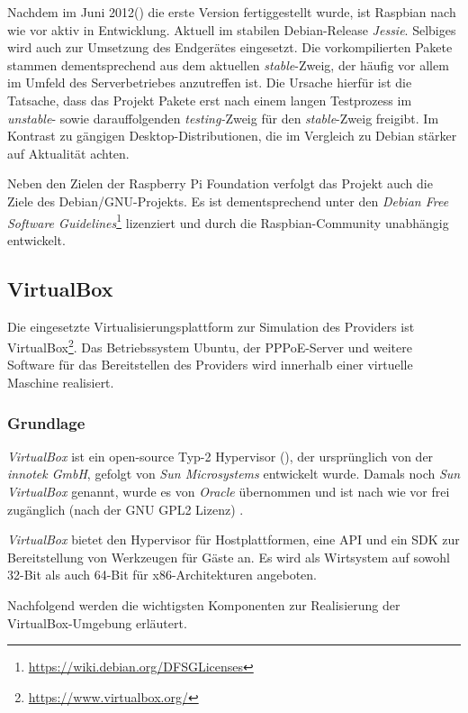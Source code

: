 Nachdem im Juni 2012(\cite{raspbianweb}) die erste
Version fertiggestellt wurde, ist Raspbian nach wie vor aktiv
in Entwicklung. Aktuell im stabilen Debian-Release \textit{Jessie}.
Selbiges wird auch zur Umsetzung des Endgerätes eingesetzt.
Die vorkompilierten Pakete stammen dementsprechend aus dem aktuellen
\textit{stable}-Zweig, der häufig vor allem im Umfeld des Serverbetriebes
anzutreffen ist. Die Ursache hierfür ist die Tatsache, dass das
Projekt Pakete erst nach einem langen Testprozess im \textit{unstable}-
sowie darauffolgenden \textit{testing-}Zweig für den \textit{stable}-Zweig
freigibt. Im Kontrast zu gängigen Desktop-Distributionen, die
im Vergleich zu Debian stärker auf Aktualität achten.

Neben den Zielen der Raspberry Pi Foundation verfolgt das Projekt
auch die Ziele des Debian/GNU-Projekts. Es ist dementsprechend unter
den \textit{Debian Free Software Guidelines}\footnote{\url{https://wiki.debian.org/DFSGLicenses}}
lizenziert und durch die Raspbian-Community unabhängig entwickelt.
  
\subsection[VirtualBox (Schenkel)]{VirtualBox}
Die eingesetzte Virtualisierungsplattform zur Simulation des Providers ist VirtualBox\footnote{\url{https://www.virtualbox.org/}}. Das Betriebssystem Ubuntu, der PPPoE-Server und weitere Software für
das Bereitstellen des Providers wird innerhalb einer virtuelle Maschine realisiert.

\subsubsection[Grundlage (Schenkel)]{Grundlage}
\textit{VirtualBox} ist ein open-source Typ-2 Hypervisor (), der
ursprünglich von der \textit{innotek GmbH}, gefolgt von \textit{Sun Microsystems} entwickelt wurde.
Damals noch \textit{Sun VirtualBox} genannt, wurde es von \textit{Oracle} übernommen und ist
nach wie vor frei zugänglich (nach der GNU GPL2 Lizenz) \cite{dash13}.

\textit{VirtualBox} bietet den Hypervisor für Hostplattformen, eine API und ein SDK zur
Bereitstellung von Werkzeugen für Gäste an. Es wird als Wirtsystem auf sowohl 32-Bit als auch
64-Bit für x86-Architekturen angeboten.

Nachfolgend werden die wichtigsten Komponenten zur Realisierung der VirtualBox-Umgebung
erläutert.

